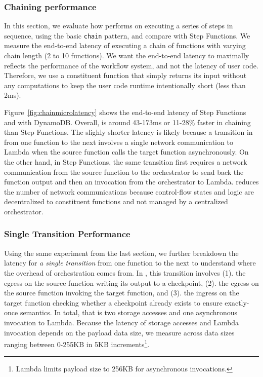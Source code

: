\subsubsection{Chaining performance}\label{sec:eval:chain}

In this section, we evaluate how \name{} performs on executing a series of
steps in sequence, using the basic \texttt{chain} pattern, and compare with
Step Functions. We measure the end-to-end latency of executing a chain of
functions with varying chain length (2 to 10 functions). We want the
end-to-end latency to maximally reflects the performance of the workflow
system, and not the latency of user code. Therefore, we use a constituent
function that simply returns its input without any computations to keep the
user code runtime intentionally short (less than 2ms).

Figure~\ref{fig:chainmicrolatency} shows the end-to-end latency of Step
Functions and \name{} with DynamoDB. Overall, \name{} is around 43-173ms or
11-28\% faster in chaining than Step Functions. The slighly shorter latency is
likely because a transition in \name{} from one function to the next involves
a single network communication to Lambda when the source function calls the
target function asynchronously. On the other hand, in Step Functions, the same
transition first requires a network communication from the source function to
the orchestrator to send back the function output and then an invocation from
the orchestrator to Lambda. \name{} reduces the number of network
communications because control-flow states and logic are decentralized to
constituent functions and not managed by a centralized orchestrator.

\subsubsection{Single Transition Performance}

Using the same experiment from the last section, we further breakdown the
latency for \emph{a single transition} from one function to the next to
understand where the overhead of orchestration comes from. In \name{}, this
transition involves (1). the egress on the source function writing its output
to a checkpoint, (2). the egress on the source function invoking the target
function, and (3). the ingress on the target function checking whether a
checkpoint already exists to ensure exactly-once semantics. In total, that is
two storage accesses and one asynchronous invocation to Lambda. Because the
latency of storage accesses and Lambda invocation depends on the payload data
size, we measure across data sizes ranging between 0-255KB in 5KB
increments\footnote{Lambda limits payload size to 256KB for asynchronous
invocations.}.

